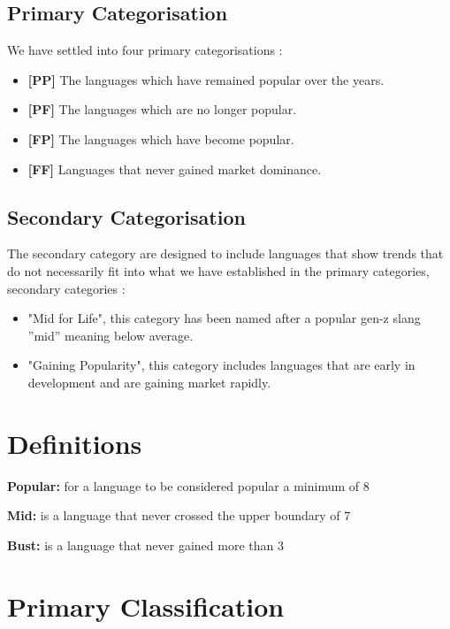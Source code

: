 \documentclass[conference]{IEEEtran}
\begin{document}
\subsection{Primary Categorisation}\label{AA}
We have settled into four primary categorisations : 

\begin{itemize}
\item \textbf{[PP]} The languages which have remained popular over the years.
\item \textbf{[PF]} The languages which are no longer popular.
\item \textbf{[FP]} The languages which have become popular.
\item \textbf{[FF]} Languages that never gained market dominance.
\end{itemize}

\subsection{Secondary Categorisation}
The secondary category are designed to include languages that show  trends that do not necessarily fit into what we have established in the primary categories, secondary categories :
\begin{itemize}
\item "Mid for Life", this category has been named after a popular gen-z slang ''mid'' meaning below average.
\item "Gaining Popularity", this category includes languages that are early in development and are gaining market rapidly.
\end{itemize}

\section{Definitions}
\textbf{Popular:} for a language to be considered popular a minimum of 8%

\textbf{Mid:} is a language that never crossed the upper boundary of 7%

\textbf{Bust:} is a language that never gained more than 3%

\section{Primary Classification}
\end{document}
